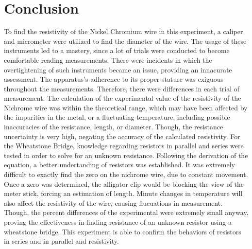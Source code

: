 \documentclass[titlepage]{article}
\begin{document}
	\section{Conclusion}
To find the resistivity of the Nickel Chromium wire in this experiment, a caliper and micrometer were utilized to find the diameter of the wire. The usage of these instruments led to a mastery, since a lot of trials were conducted to become comfortable reading measurements. There were incidents in which the overtightening of such instruments became an issue, providing an innacurate assessment. The apparatus's adherence to its proper stature was exiguous throughout the measurements. Therefore, there were differences in each trial of measurement. The calculation of the experimental value of the resistivity of the Nichrome wire was within the theoretical range, which may have been affected by the impurities in the metal, or a fluctuating temperature, including possible inaccuracies of the resistance, length, or diameter. Though, the resistance uncertainty is very high, negating the accuracy of the calculated resistivity. For the Wheatstone Bridge, knowledge regarding  resistors in parallel and series were tested in order to solve for an unknown resistance. Following the derivation of the equation, a better undertanding of resistors was established. It was extremely difficult to exactly find the zero on the nichrome wire, due to constant movement. Once a zero was determined, the alligator clip would be blocking the view of the meter stick, forcing an estimation of length. Minute changes in temperature will also affect the resistivity of the wire, causing flucuations in measurement. Though, the percent differences of the experimental were extremely small anyway, proving the effectiveness in finding resistance of an unknown resistor using a wheatstone bridge. This experiment is able to confirm the behaviors of resistors in series and in parallel and resistivity.
\end{document}
